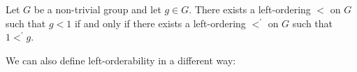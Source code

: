 \begin{fact} Let $G$ be a non-trivial group and let $g\in{}G$. There exists a left-ordering $<$ on $G$ such that $g<1$ if and only if there exists a left-ordering $<^\prime$ on $G$ such that $1<^\prime g$.
\label{fact:WLOG}
\end{fact}

\noindent{}We can also define left-orderability in a different way:

